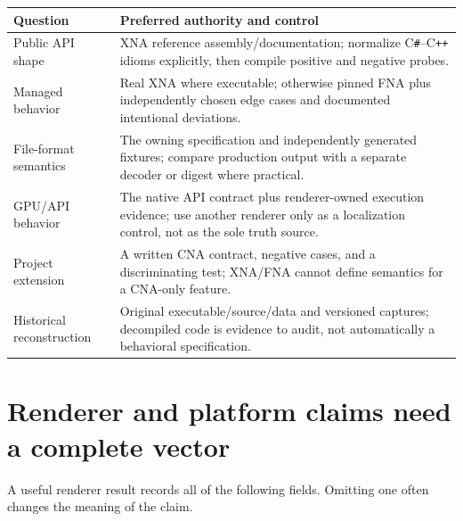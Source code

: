 \begin{center}
\begin{tabular}{p{3.1cm}p{8.1cm}}
\toprule
\textbf{Question} & \textbf{Preferred authority and control} \\
\midrule
Public API shape & XNA reference assembly/documentation; normalize C\texttt{\#}--C\texttt{++}
  idioms explicitly, then compile positive and negative probes. \\
Managed behavior & Real XNA where executable; otherwise pinned FNA plus independently chosen edge
  cases and documented intentional deviations. \\
File-format semantics & The owning specification and independently generated fixtures; compare
  production output with a separate decoder or digest where practical. \\
GPU/API behavior & The native API contract plus renderer-owned execution evidence; use another
  renderer only as a localization control, not as the sole truth source. \\
Project extension & A written CNA contract, negative cases, and a discriminating test; XNA/FNA
  cannot define semantics for a CNA-only feature. \\
Historical reconstruction & Original executable/source/data and versioned captures; decompiled
  code is evidence to audit, not automatically a behavioral specification. \\
\bottomrule
\end{tabular}
\end{center}

\section{Renderer and platform claims need a complete vector}

A useful renderer result records all of the following fields.  Omitting one often changes the
meaning of the claim.

